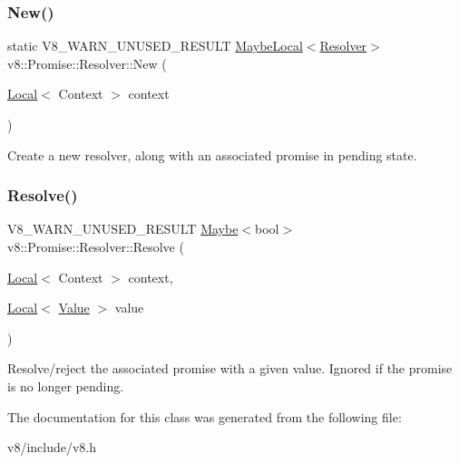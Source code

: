 \subsubsection{\texorpdfstring{New()}{New()}}
{\footnotesize\ttfamily static V8\+\_\+\+W\+A\+R\+N\+\_\+\+U\+N\+U\+S\+E\+D\+\_\+\+R\+E\+S\+U\+LT \mbox{\hyperlink{classv8_1_1MaybeLocal}{Maybe\+Local}}$<$\mbox{\hyperlink{classv8_1_1Promise_1_1Resolver}{Resolver}}$>$ v8\+::\+Promise\+::\+Resolver\+::\+New (\begin{DoxyParamCaption}\item[{\mbox{\hyperlink{classv8_1_1Local}{Local}}$<$ Context $>$}]{context }\end{DoxyParamCaption})\hspace{0.3cm}{\ttfamily [static]}}

Create a new resolver, along with an associated promise in pending state. \mbox{\label{classv8_1_1Promise_1_1Resolver_a7e5ba9aab1a36574fdfad04da9a543a5}} 
\subsubsection{\texorpdfstring{Resolve()}{Resolve()}}
{\footnotesize\ttfamily V8\+\_\+\+W\+A\+R\+N\+\_\+\+U\+N\+U\+S\+E\+D\+\_\+\+R\+E\+S\+U\+LT \mbox{\hyperlink{classv8_1_1Maybe}{Maybe}}$<$bool$>$ v8\+::\+Promise\+::\+Resolver\+::\+Resolve (\begin{DoxyParamCaption}\item[{\mbox{\hyperlink{classv8_1_1Local}{Local}}$<$ Context $>$}]{context,  }\item[{\mbox{\hyperlink{classv8_1_1Local}{Local}}$<$ \mbox{\hyperlink{classv8_1_1Value}{Value}} $>$}]{value }\end{DoxyParamCaption})}

Resolve/reject the associated promise with a given value. Ignored if the promise is no longer pending. 

The documentation for this class was generated from the following file\+:\begin{DoxyCompactItemize}
\item 
v8/include/v8.\+h\end{DoxyCompactItemize}
